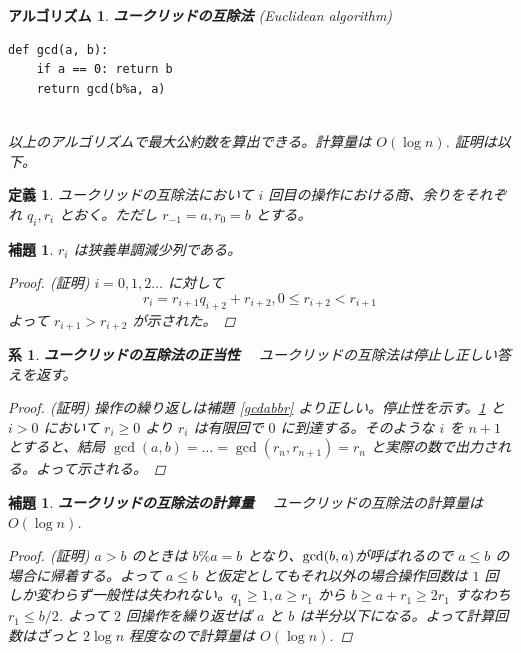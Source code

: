 \documentclass[12pt, a4j]{ltjsarticle}
\newtheorem{lem}[thm]{補題}
\newtheorem{defi}[thm]{定義}
\newtheorem{cor}[thm]{系}
\newtheorem{alg}[thm]{アルゴリズム}
\begin{document}
\vspace{1cm}

\begin{alg}{\bf ユークリッドの互除法} (Euclidean algorithm) \upshape \label{euglidean}
\\
\begin{lstlisting}
def gcd(a, b):
    if a == 0: return b
    return gcd(b%a, a)
\end{lstlisting}
\quad\\
以上のアルゴリズムで最大公約数を算出できる。計算量は $O(\log n)$. 証明は以下。
\end{alg}

\vspace{1cm}

\begin{defi}
ユークリッドの互除法において $i$ 回目の操作における商、余りをそれぞれ $q_i, r_i$ とおく。ただし $r_{-1}=a, r_0 = b$ とする。
\end{defi}

\vspace{1cm}

\begin{lem}\label{eucstop}
$r_i$ は狭義単調減少列である。
\begin{proof} (証明)
  $i = 0, 1, 2 \ldots$ に対して
  \begin{equation}
  r_i = r_{i+1}q_{i+2} + r_{i+2}, 0\le r_{i+2} < r_{i+1}
  \end{equation}
  よって $r_{i+1}>r_{i+2}$ が示された。
\end{proof}
\end{lem}

\vspace{1cm}

\begin{cor}{\bf ユークリッドの互除法の正当性}　
ユークリッドの互除法は停止し正しい答えを返す。
\begin{proof} (証明)
操作の繰り返しは補題 {\it \ref{gcdabbr}} より正しい。停止性を示す。{\it \ref{eucstop}} と $i>0$ において $r_i\ge0$ より $r_i$ は有限回で $0$ に到達する。そのような $i$ を $n+1$ とすると、結局 $\gcd(a,b)=\ldots=\gcd(r_n, r_{n+1})=r_n$ と実際の数で出力される。よって示される。
\end{proof}
\end{cor}

\vspace{1cm}

\begin{lem}{\bf ユークリッドの互除法の計算量}\label{EuclidO}　
ユークリッドの互除法の計算量は $O(\log n)$.
\begin{proof} (証明)
$a>b$ のときは $b \% a = b$ となり、${\rm gcd}(b,a)$が呼ばれるので $a\le b$ の場合に帰着する。よって $a\le b$ と仮定としてもそれ以外の場合操作回数は $1$ 回しか変わらず一般性は失われない。$q_1 \ge 1, a \ge r_1$ から $b \ge a + r_1 \ge 2r_1$ すなわち $r_1 \le b/2$. よって $2$ 回操作を繰り返せば $a$ と $b$ は半分以下になる。よって計算回数はざっと $2\log n$ 程度なので計算量は $O(\log n)$.
\end{proof}
\end{lem}
\end{document}
